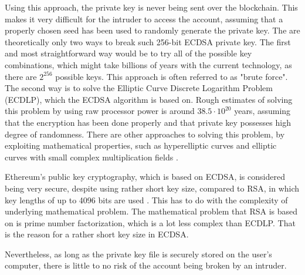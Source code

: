 Using this approach, the private key is never being sent over the blockchain. This makes it very difficult for the intruder to access the account, assuming that a properly chosen seed has been used to randomly generate the private key. The are theoretically only two ways to break such 256-bit ECDSA private key. The first and most straightforward way would be to try all of the possible key combinations, which might take billions of years with the current technology, as there are $2^{256}$ possible keys. This approach is often referred to as "brute force". The second way is to solve the Elliptic Curve Discrete Logarithm Problem (ECDLP), which the ECDSA algorithm is based on. Rough estimates of solving this problem by using raw processor power is around $38.5 \cdot 10^{20}$ years, assuming that the encryption has been done properly and that private key possesses high degree of randomness. There are other approaches to solving this problem, by exploiting mathematical properties, such as hyperelliptic curves and elliptic curves with small complex multiplication fields \citep{ecdsa}.

Ethereum's public key cryptography, which is based on ECDSA, is considered being very secure, despite using rather short key size, compared to RSA, in which key lengths of up to 4096 bits are used \citep{rsakeys}. This has to do with the complexity of underlying mathematical problem. The mathematical problem that RSA is based on is prime number factorization, which is a lot less complex than ECDLP. That is the reason for a rather short key size in ECDSA.

Nevertheless, as long as the private key file is securely stored on the user's computer, there is little to no risk of the account being broken by an intruder.
